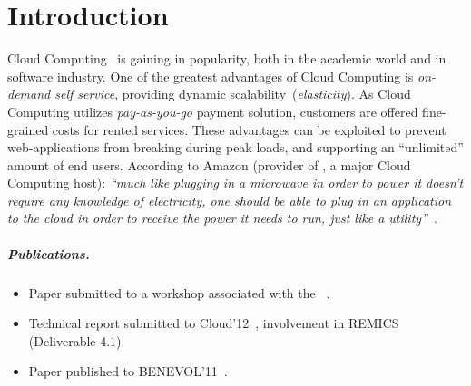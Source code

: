 \chapter{Introduction}

Cloud Computing~\cite{Armbrust:EECS-2009-28} is gaining in popularity,
both in the academic world and in software industry.
One of the greatest advantages of Cloud Computing is \emph{on-demand self service},
providing dynamic scalability~(\emph{elasticity}).
As Cloud Computing utilizes \emph{pay-as-you-go} payment solution,
customers are offered fine-grained costs for rented services.
These advantages can be exploited to prevent web-applications
from breaking during peak loads, and supporting an ``unlimited''
amount of end users.
According to Amazon (provider of , a major Cloud Computing host):
\emph{``much like plugging in a microwave
in order to power it doesn't require any knowledge of electricity,
one should be able to plug in an application to the cloud in order
to receive the power it needs to run, 
just like a utility''}~\cite{aws:varia10}.

\paragraph{Publications.}

\begin{itemize}
  \item
    Paper submitted to a workshop associated with the ~\cite{ecmfa4clouda}.
  \item
    Technical report submitted to Cloud'12~\cite{remics_4_1}, 
    involvement in REMICS (Deliverable 4.1).
  \item
    Paper published to BENEVOL'11~\cite{mosser-brandtzæg-etal:2011}.
\end{itemize}

